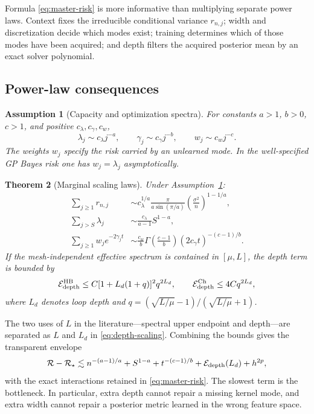 \documentclass[11pt,a4paper]{article}
\numberwithin{equation}{section}
\newtheorem{theorem}{Theorem}[section]
\newtheorem{assumption}[theorem]{Assumption}
\theoremstyle{definition}
\theoremstyle{remark}
\newcommand{\calR}{\mathcal R}
\newcommand{\calE}{\mathcal E}
\begin{document}
Formula \eqref{eq:master-risk} is more informative than multiplying separate
power laws.  Context fixes the irreducible conditional variance $r_{n,j}$;
width and discretization decide which modes exist; training determines which
of those modes have been acquired; and depth filters the acquired posterior
mean by an exact solver polynomial.

\subsection{Power-law consequences}

\begin{assumption}[Capacity and optimization spectra]
\label{ass:power-law}
For constants $a>1$, $b>0$, $c>1$, and positive $c_\lambda,c_\gamma,c_w$,
\begin{equation}
 \lambda_j\sim c_\lambda j^{-a},\qquad
 \gamma_j\sim c_\gamma j^{-b},\qquad
 w_j\sim c_wj^{-c}.
 \label{eq:power-laws}
\end{equation}
The weights $w_j$ specify the risk carried by an unlearned mode.  In the
well-specified GP Bayes risk one has $w_j=\lambda_j$ asymptotically.
\end{assumption}

\begin{theorem}[Marginal scaling laws]
\label{thm:marginal-scaling}
Under Assumption~\ref{ass:power-law}:
\begin{align}
 \sum_{j\ge1}r_{n,j}
 &\sim
 c_\lambda^{1/a}
 \frac{\pi}{a\sin(\pi/a)}
 \left(\frac{\sigma^2}{n}\right)^{1-1/a},
 \label{eq:context-scaling}\\
 \sum_{j>S}\lambda_j
 &\sim\frac{c_\lambda}{a-1}S^{1-a},
 \label{eq:width-scaling}\\
 \sum_{j\ge1}w_je^{-2\gamma_jt}
 &\sim
 \frac{c_w}{b}
 \Gamma\!\left(\frac{c-1}{b}\right)
 (2c_\gamma t)^{-(c-1)/b}.
 \label{eq:time-scaling}
\end{align}
If the mesh-independent effective spectrum is contained in $[\mu,L]$, the
depth term is bounded by
\begin{equation}
 \calE_{\rm depth}^{\rm HB}
 \le C[1+L_d(1+q)]^2q^{2L_d},
 \qquad
 \calE_{\rm depth}^{\rm Ch}\le4Cq^{2L_d},
 \label{eq:depth-scaling}
\end{equation}
where $L_d$ denotes loop depth and
$q=(\sqrt{L/\mu}-1)/(\sqrt{L/\mu}+1)$.
\end{theorem}

The two uses of $L$ in the literature---spectral upper endpoint and depth---are
separated as $L$ and $L_d$ in \eqref{eq:depth-scaling}.  Combining the bounds
gives the transparent envelope
\begin{equation}
 \calR-\calR_\star
 \lesssim
 n^{-(a-1)/a}
 +S^{1-a}
 +t^{-(c-1)/b}
 +\calE_{\rm depth}(L_d)
 +h^{2p},
 \label{eq:joint-envelope}
\end{equation}
with the exact interactions retained in \eqref{eq:master-risk}.  The slowest
term is the bottleneck.  In particular, extra depth cannot repair a missing
kernel mode, and extra width cannot repair a posterior metric learned in the
wrong feature space.
\end{document}

